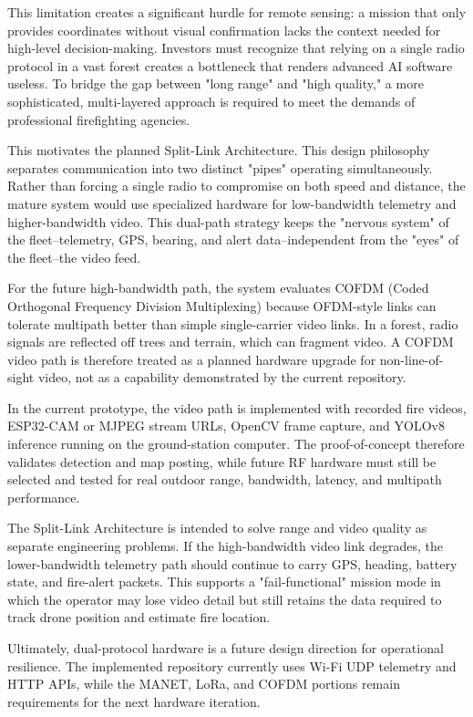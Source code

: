\documentclass[journal, onecolumn]{IEEEtran}
\begin{document}
This limitation creates a significant hurdle for remote sensing: a mission that only provides coordinates without visual confirmation lacks the context needed for high-level decision-making. Investors must recognize that relying on a single radio protocol in a vast forest creates a bottleneck that renders advanced AI software useless. To bridge the gap between "long range" and "high quality," a more sophisticated, multi-layered approach is required to meet the demands of professional firefighting agencies.

This motivates the planned Split-Link Architecture. This design philosophy separates communication into two distinct "pipes" operating simultaneously. Rather than forcing a single radio to compromise on both speed and distance, the mature system would use specialized hardware for low-bandwidth telemetry and higher-bandwidth video. This dual-path strategy keeps the "nervous system" of the fleet--telemetry, GPS, bearing, and alert data--independent from the "eyes" of the fleet--the video feed.

For the future high-bandwidth path, the system evaluates COFDM (Coded Orthogonal Frequency Division Multiplexing) because OFDM-style links can tolerate multipath better than simple single-carrier video links. In a forest, radio signals are reflected off trees and terrain, which can fragment video. A COFDM video path is therefore treated as a planned hardware upgrade for non-line-of-sight video, not as a capability demonstrated by the current repository.

In the current prototype, the video path is implemented with recorded fire videos, ESP32-CAM or MJPEG stream URLs, OpenCV frame capture, and YOLOv8 inference running on the ground-station computer. The proof-of-concept therefore validates detection and map posting, while future RF hardware must still be selected and tested for real outdoor range, bandwidth, latency, and multipath performance.

The Split-Link Architecture is intended to solve range and video quality as separate engineering problems. If the high-bandwidth video link degrades, the lower-bandwidth telemetry path should continue to carry GPS, heading, battery state, and fire-alert packets. This supports a "fail-functional" mission mode in which the operator may lose video detail but still retains the data required to track drone position and estimate fire location.

Ultimately, dual-protocol hardware is a future design direction for operational resilience. The implemented repository currently uses Wi-Fi UDP telemetry and HTTP APIs, while the MANET, LoRa, and COFDM portions remain requirements for the next hardware iteration.
\end{document}
